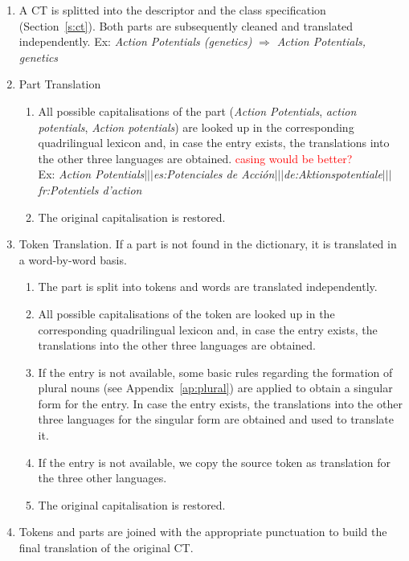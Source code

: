 \documentclass[a4paper,11pt]{article}
\newcommand{\red}[1]{\textcolor{red}{#1}}
\begin{document}
	\begin{enumerate}
		\item A CT is splitted into the descriptor and the class specification (Section~\ref{s:ct}). Both parts are subsequently cleaned and translated independently. 
		Ex: \emph{Action Potentials (genetics)} $\Rightarrow$ \emph{Action Potentials, genetics}
		\item Part Translation
		\begin{enumerate}[label*=\arabic*.]
			\item  All possible capitalisations of the part (\emph{Action Potentials}, \emph{action potentials}, \emph{Action potentials}) are looked up in the corresponding quadrilingual lexicon and, in case the entry exists, the translations into the other three languages are obtained. \red{casing would be better?}\\ 
			Ex: \emph{Action Potentials$|||$es:Potenciales de Acción$|||$de:Aktionspotentiale$|||$fr:Potentiels d'action}
			\item The original capitalisation is restored.
		\end{enumerate}
		
		\item Token Translation. If a part is not found in the dictionary, it is translated in a word-by-word basis.
		\begin{enumerate}[label*=\arabic*.]
			\item The part is split into tokens and words are translated independently.  
			\item  All possible capitalisations of the token are looked up in the corresponding quadrilingual lexicon and, in case the entry exists, the translations into the other three languages are obtained.
			\item If the entry is not available, some basic rules regarding the formation of plural nouns (see Appendix~\ref{ap:plural}) are applied to obtain a singular form for the entry. In case the entry exists, the translations into the other three languages for the singular form are obtained and used to translate it.
			\item If the entry is not available, we copy the source token as translation for the three other languages.
			\item The original capitalisation is restored.
		\end{enumerate}
		
		\item Tokens and parts are joined with the appropriate punctuation to build the final translation of the original CT.
		
	\end{enumerate}
	
\end{document}
